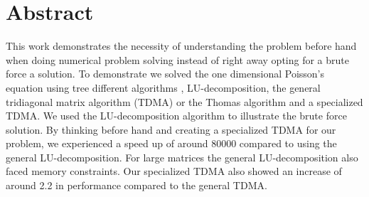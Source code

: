 \section*{Abstract}
This work demonstrates the necessity of understanding the problem
before hand when doing numerical problem solving instead of right away opting
for a brute force a solution. To demonstrate we solved the one dimensional
Poisson's equation using tree different algorithms 
, LU-decomposition, the general tridiagonal matrix algorithm (TDMA) or the
Thomas algorithm \cite{tridia} and a specialized TDMA.
We used the LU-decomposition algorithm to illustrate the brute force solution.
By thinking before hand and creating a specialized TDMA for our problem, we
experienced a speed up 
of around 80000 compared to using the general LU-decomposition. For large
matrices the general LU-decomposition also faced memory constraints. Our
specialized TDMA also showed an increase of around 2.2 in performance compared to the general TDMA.     